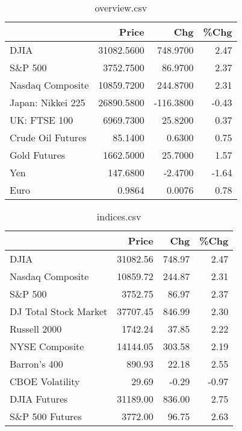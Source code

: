 \documentclass{article}%
\begin{document}
\begin{table}[htbp]%
\caption{overview.csv}%
\centering%
\begin{adjustbox}{width=1\textwidth}%
\begin{tabular}{lrrr}
\toprule
                  &      Price &       Chg &  \%Chg \\
\midrule
             DJIA & 31082.5600 &  748.9700 &  2.47 \\
          S\&P 500 &  3752.7500 &   86.9700 &  2.37 \\
 Nasdaq Composite & 10859.7200 &  244.8700 &  2.31 \\
Japan: Nikkei 225 & 26890.5800 & -116.3800 & -0.43 \\
     UK: FTSE 100 &  6969.7300 &   25.8200 &  0.37 \\
Crude Oil Futures &    85.1400 &    0.6300 &  0.75 \\
     Gold Futures &  1662.5000 &   25.7000 &  1.57 \\
              Yen &   147.6800 &   -2.4700 & -1.64 \\
             Euro &     0.9864 &    0.0076 &  0.78 \\
\bottomrule
\end{tabular}
%
\end{adjustbox}%
\end{table}

%


\begin{table}[htbp]%
\caption{indices.csv}%
\centering%
\begin{adjustbox}{width=1\textwidth}%
\begin{tabular}{lrrr}
\toprule
                      &    Price &    Chg &  \%Chg \\
\midrule
                 DJIA & 31082.56 & 748.97 &  2.47 \\
     Nasdaq Composite & 10859.72 & 244.87 &  2.31 \\
              S\&P 500 &  3752.75 &  86.97 &  2.37 \\
DJ Total Stock Market & 37707.45 & 846.99 &  2.30 \\
         Russell 2000 &  1742.24 &  37.85 &  2.22 \\
       NYSE Composite & 14144.05 & 303.58 &  2.19 \\
         Barron's 400 &   890.93 &  22.18 &  2.55 \\
      CBOE Volatility &    29.69 &  -0.29 & -0.97 \\
         DJIA Futures & 31189.00 & 836.00 &  2.75 \\
      S\&P 500 Futures &  3772.00 &  96.75 &  2.63 \\
\bottomrule
\end{tabular}
%
\end{adjustbox}%
\end{table}
\end{document}
